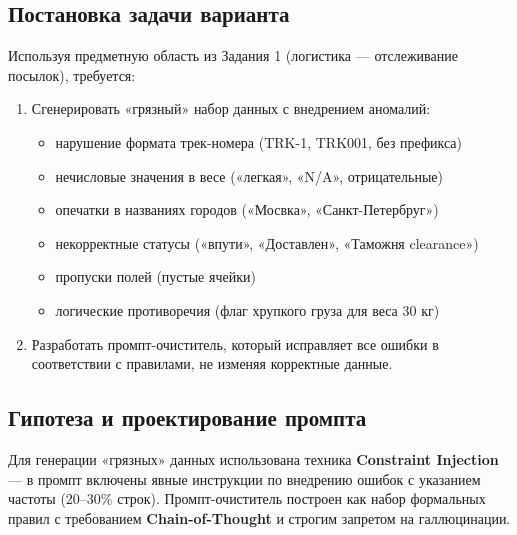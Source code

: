 \documentclass[oneside,a4paper,14pt]{extarticle} %
\begin{document}
\subsection{Постановка задачи варианта}
\noindent
Используя предметную область из Задания 1 (логистика --- отслеживание посылок), требуется:
\begin{enumerate}
\item Сгенерировать «грязный» набор данных с внедрением аномалий:
\begin{itemize}
\item нарушение формата трек-номера (TRK-1, TRK001, без префикса)
\item нечисловые значения в весе («легкая», «N/A», отрицательные)
\item опечатки в названиях городов («Мосвка», «Санкт-Петербруг»)
\item некорректные статусы («впути», «Доставлен», «Таможня clearance»)
\item пропуски полей (пустые ячейки)
\item логические противоречия (флаг хрупкого груза для веса 30 кг)
\end{itemize}
\item Разработать промпт-очиститель, который исправляет все ошибки в соответствии с правилами, не изменяя корректные данные.
\end{enumerate}
\subsection{Гипотеза и проектирование промпта}
\noindent
Для генерации «грязных» данных использована техника \textbf{Constraint Injection} --- в промпт включены явные инструкции по внедрению ошибок с указанием частоты (20--30\% строк). Промпт-очиститель построен как набор формальных правил с требованием \textbf{Chain-of-Thought} и строгим запретом на галлюцинации.
\newpage
\end{document}

